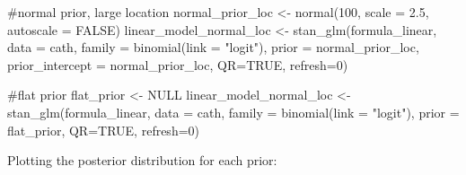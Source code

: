 \documentclass[
  letterpaper,
  DIV=11,
  numbers=noendperiod]{scrartcl}
\newenvironment{Shaded}{\begin{snugshade}}{\end{snugshade}}
\newcommand{\AttributeTok}[1]{\textcolor[rgb]{0.40,0.45,0.13}{#1}}
\newcommand{\CommentTok}[1]{\textcolor[rgb]{0.37,0.37,0.37}{#1}}
\newcommand{\ConstantTok}[1]{\textcolor[rgb]{0.56,0.35,0.01}{#1}}
\newcommand{\DecValTok}[1]{\textcolor[rgb]{0.68,0.00,0.00}{#1}}
\newcommand{\FloatTok}[1]{\textcolor[rgb]{0.68,0.00,0.00}{#1}}
\newcommand{\FunctionTok}[1]{\textcolor[rgb]{0.28,0.35,0.67}{#1}}
\newcommand{\NormalTok}[1]{\textcolor[rgb]{0.00,0.23,0.31}{#1}}
\newcommand{\OtherTok}[1]{\textcolor[rgb]{0.00,0.23,0.31}{#1}}
\newcommand{\StringTok}[1]{\textcolor[rgb]{0.13,0.47,0.30}{#1}}
\begin{document}
\begin{Shaded}
\begin{Highlighting}[]
\CommentTok{\#normal prior, large location}
\NormalTok{normal\_prior\_loc }\OtherTok{\textless{}{-}} \FunctionTok{normal}\NormalTok{(}\DecValTok{100}\NormalTok{, }\AttributeTok{scale =} \FloatTok{2.5}\NormalTok{, }\AttributeTok{autoscale =} \ConstantTok{FALSE}\NormalTok{)}
\NormalTok{linear\_model\_normal\_loc }\OtherTok{\textless{}{-}} \FunctionTok{stan\_glm}\NormalTok{(formula\_linear, }\AttributeTok{data =}\NormalTok{ cath,}
                \AttributeTok{family =} \FunctionTok{binomial}\NormalTok{(}\AttributeTok{link =} \StringTok{"logit"}\NormalTok{),}
                \AttributeTok{prior =}\NormalTok{ normal\_prior\_loc, }\AttributeTok{prior\_intercept =}\NormalTok{ normal\_prior\_loc,}
                \AttributeTok{QR=}\ConstantTok{TRUE}\NormalTok{, }\AttributeTok{refresh=}\DecValTok{0}\NormalTok{)}

\CommentTok{\#flat prior}
\NormalTok{flat\_prior }\OtherTok{\textless{}{-}} \ConstantTok{NULL}
\NormalTok{linear\_model\_normal\_loc }\OtherTok{\textless{}{-}} \FunctionTok{stan\_glm}\NormalTok{(formula\_linear, }\AttributeTok{data =}\NormalTok{ cath,}
                \AttributeTok{family =} \FunctionTok{binomial}\NormalTok{(}\AttributeTok{link =} \StringTok{"logit"}\NormalTok{),}
                \AttributeTok{prior =}\NormalTok{ flat\_prior,}
                \AttributeTok{QR=}\ConstantTok{TRUE}\NormalTok{, }\AttributeTok{refresh=}\DecValTok{0}\NormalTok{)}
\end{Highlighting}
\end{Shaded}

Plotting the posterior distribution for each prior:
\end{document}
